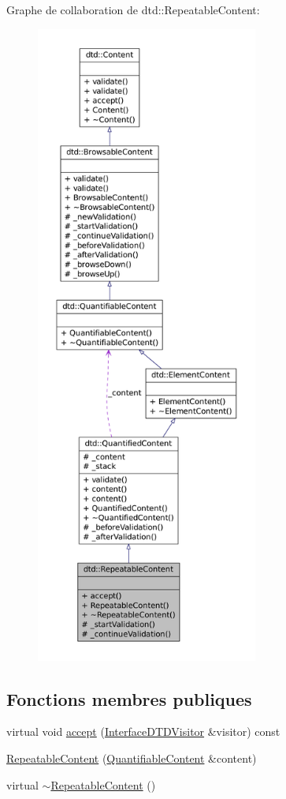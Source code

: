 Graphe de collaboration de dtd::RepeatableContent:\nopagebreak
\begin{figure}[H]
\begin{center}
\leavevmode
\includegraphics[height=600pt]{classdtd_1_1_repeatable_content__coll__graph}
\end{center}
\end{figure}
\subsection*{Fonctions membres publiques}
\begin{DoxyCompactItemize}
\item 
virtual void \hyperlink{classdtd_1_1_repeatable_content_a28550745ec781816e4be44165dbb3934}{accept} (\hyperlink{classdtd_1_1_interface_d_t_d_visitor}{InterfaceDTDVisitor} \&visitor) const 
\item 
\hyperlink{classdtd_1_1_repeatable_content_a5aa05c57a86876a8f23420ac7df42de6}{RepeatableContent} (\hyperlink{classdtd_1_1_quantifiable_content}{QuantifiableContent} \&content)
\item 
virtual \hyperlink{classdtd_1_1_repeatable_content_a2eec6b242d0ef49af02f530405fb3525}{$\sim$RepeatableContent} ()
\end{DoxyCompactItemize}
